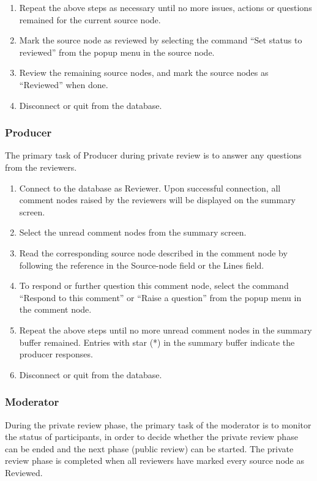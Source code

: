 \begin{enumerate}
\item Repeat the above steps as necessary until no more issues,
actions or questions remained for the current source node.
\item Mark the source node as reviewed by selecting the command ``Set
status to reviewed'' from the popup menu in the source node.
\item Review the remaining source nodes, and mark the source nodes as
``Reviewed'' when done.
\item Disconnect or quit from the database.

\end{enumerate}


\subsubsection*{Producer}
The primary task of Producer during private review is to answer any
questions from the reviewers.
\begin{enumerate}
\item Connect to the database as Reviewer. Upon successful connection,
all comment nodes raised by the reviewers will be displayed on the
summary screen. 
\item Select the unread comment nodes from the summary screen.
\item Read the corresponding source node described in the comment node
by following the reference in the Source-node field or the Lines
field. 
\item To respond or further question this comment node, select the
command ``Respond to this comment'' or ``Raise a question'' from the
popup menu in the comment node.
\item Repeat the above steps until no more unread comment nodes in the
summary buffer remained. 
Entries with star (*) in the summary buffer indicate the producer
responses. 
\item Disconnect or quit from the database.
\end{enumerate}

\subsubsection*{Moderator}
During the private review phase, the primary task of the moderator is to
monitor the status of participants, in order to decide whether the
private review phase can be ended and the next phase (public review)
can be started.
The private review phase is completed when all reviewers have marked
every source node as Reviewed.


